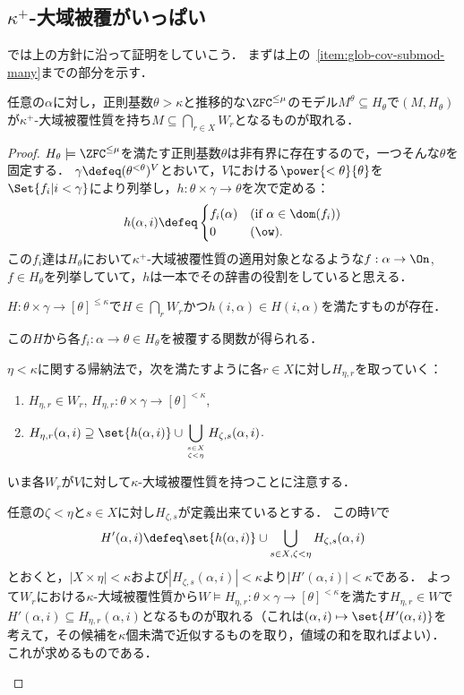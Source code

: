 \documentclass[a4j,leqno]{ltjsarticle}
\begin{document}
\subsection{$\kappa^+$-大域被覆がいっぱい}
では上の方針に沿って証明をしていこう．
まずは上の~\ref{item:glob-cov-submod-many}までの部分を示す．
\begin{lemma}\label{lem:cof-many-gl-cov}
 任意の$\alpha$に対し，正則基数$\theta > \kappa$と推移的な$\ZFC^{\leq\mu}$のモデル$M^\theta \subseteq H_\theta$で$(M, H_\theta)$が$\kappa^+$-大域被覆性質を持ち$M \subseteq \bigcap_{r \in X} W_r$となるものが取れる．
\end{lemma}
\begin{proof}
 $H_\theta \models \ZFC^{\leq\mu}$を満たす正則基数$\theta$は非有界に存在するので，一つそんな$\theta$を固定する．
 $\gamma \defeq (\theta^{<\theta})^V$とおいて，$V$における$\power{<\theta}{\theta}$を$\Set{f_i | i < \gamma}$により列挙し，$h: \theta \times \gamma \to \theta$を次で定める：
 \[
 h(\alpha, i) \defeq
 \begin{cases}
  f_i(\alpha) & (\text{if } \alpha \in \dom(f_i))\\
  0             & (\ow).
 \end{cases}
 \]
 この$f_i$達は$H_\theta$において$\kappa^+$-大域被覆性質の適用対象となるような$f: \alpha \to \On$, $f \in H_\theta$を列挙していて，$h$は一本でその辞書の役割をしていると思える．
 \begin{claim}
  $H: \theta \times \gamma \to [\theta]^{\leq \kappa}$で$H \in \bigcap_r W_r$かつ$h(i, \alpha) \in H(i, \alpha)$を満たすものが存在．
 \end{claim}
 この$H$から各$f_i: \alpha \to \theta \in H_\theta$を被覆する関数が得られる．
 \begin{subproof}
  $\eta < \kappa$に関する帰納法で，次を満たすように各$r \in X$に対し$H_{\eta, r}$を取っていく：
  \begin{enumerate}
   \item $H_{\eta, r} \in W_r$, $H_{\eta, r}: \theta \times \gamma \to [\theta]^{<\kappa}$,
   \item $\displaystyle
            H_{\eta,r}(\alpha, i)
           \supseteq \set{h(\alpha, i)} \cup \bigcup_{{s \in X}\atop{\zeta < \eta}}H_{\zeta, s}(\alpha, i)$.
  \end{enumerate}
  いま各$W_r$が$V$に対して$\kappa$-大域被覆性質を持つことに注意する．

  任意の$\zeta < \eta$と$s \in X$に対し$H_{\zeta, s}$が定義出来ているとする．
  この時$V$で
  \[
   H'(\alpha, i) \defeq \set{h(\alpha, i)} \cup \bigcup_{s \in X, \zeta < \eta} H_{\zeta, s}(\alpha, i)
  \]
  とおくと，$|X \times \eta| < \kappa$および$|H_{\zeta, s}(\alpha, i)| < \kappa$より$|H'(\alpha, i)| < \kappa$である．
  よって$W_r$における$\kappa$-大域被覆性質から$W \models H_{\eta, r} : \theta \times \gamma \to [\theta]^{<\kappa}$を満たす$H_{\eta, r} \in W$で$H'(\alpha, i) \subseteq H_{\eta, r}(\alpha, i)$となるものが取れる（これは$(\alpha, i) \mapsto \set{H'(\alpha, i)}$を考えて，その候補を$\kappa$個未満で近似するものを取り，値域の和を取ればよい）．
  これが求めるものである．


\end{subproof}
\end{proof}
\end{document}
